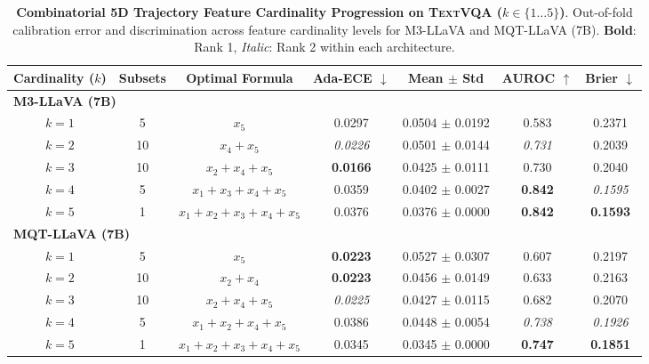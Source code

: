 \begin{table}[t]
\setlength{\tabcolsep}{3.5pt}
\renewcommand{\arraystretch}{1.05}
\centering
\footnotesize
\begin{tabular}{ccccccc}
\toprule
\textbf{Cardinality ($k$)} & \textbf{Subsets} & \textbf{Optimal Formula} & \textbf{Ada-ECE} $\downarrow$ & \textbf{Mean $\pm$ Std} & \textbf{AUROC} $\uparrow$ & \textbf{Brier} $\downarrow$ \\
\midrule
\multicolumn{7}{l}{\textbf{M3-LLaVA (7B)}} \\
\midrule
$k = 1$ & 5 & $x_{5}$ & 0.0297 & 0.0504 $\pm$ 0.0192 & 0.583 & 0.2371 \\
$k = 2$ & 10 & $x_{4} + x_{5}$ & \textit{0.0226} & 0.0501 $\pm$ 0.0144 & \textit{0.731} & 0.2039 \\
$k = 3$ & 10 & $x_{2} + x_{4} + x_{5}$ & \textbf{0.0166} & 0.0425 $\pm$ 0.0111 & 0.730 & 0.2040 \\
$k = 4$ & 5 & $x_{1} + x_{3} + x_{4} + x_{5}$ & 0.0359 & 0.0402 $\pm$ 0.0027 & \textbf{0.842} & \textit{0.1595} \\
$k = 5$ & 1 & $x_{1} + x_{2} + x_{3} + x_{4} + x_{5}$ & 0.0376 & 0.0376 $\pm$ 0.0000 & \textbf{0.842} & \textbf{0.1593} \\
\midrule
\multicolumn{7}{l}{\textbf{MQT-LLaVA (7B)}} \\
\midrule
$k = 1$ & 5 & $x_{5}$ & \textbf{0.0223} & 0.0527 $\pm$ 0.0307 & 0.607 & 0.2197 \\
$k = 2$ & 10 & $x_{2} + x_{4}$ & \textbf{0.0223} & 0.0456 $\pm$ 0.0149 & 0.633 & 0.2163 \\
$k = 3$ & 10 & $x_{2} + x_{4} + x_{5}$ & \textit{0.0225} & 0.0427 $\pm$ 0.0115 & 0.682 & 0.2070 \\
$k = 4$ & 5 & $x_{1} + x_{2} + x_{4} + x_{5}$ & 0.0386 & 0.0448 $\pm$ 0.0054 & \textit{0.738} & \textit{0.1926} \\
$k = 5$ & 1 & $x_{1} + x_{2} + x_{3} + x_{4} + x_{5}$ & 0.0345 & 0.0345 $\pm$ 0.0000 & \textbf{0.747} & \textbf{0.1851} \\
\bottomrule
\end{tabular}
\caption{\textbf{Combinatorial 5D Trajectory Feature Cardinality Progression on \textsc{TextVQA} ($k \in \{1 \dots 5\}$)}. Out-of-fold calibration error and discrimination across feature cardinality levels for M3-LLaVA and MQT-LLaVA (7B). \textbf{Bold}: Rank 1, \textit{Italic}: Rank 2 within each architecture.}
\label{tab:ablation_5d_textvqa}
\end{table}

